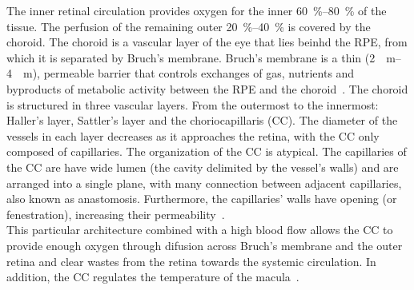 \documentclass[12pt,a4paper]{journal}
\begin{document}
The inner retinal circulation provides oxygen for the inner \SIrange{60}{80}{\percent} of the tissue.
The perfusion of the remaining outer \SIrange{20}{40}{\percent} is covered by the choroid.
The choroid is a vascular layer of the eye that lies beinhd the RPE, from which it is separated by Bruch's membrane.
Bruch's membrane is a thin (\SIrange{2}{4}{\mu\meter}), permeable barrier that controls exchanges of gas, nutrients and byproducts of metabolic activity between the RPE and the choroid~\cite{Curcio2013}. 
The choroid is structured in three vascular layers.
From the outermost to the innermost: Haller's layer, Sattler's layer and the choriocapillaris (CC).
The diameter of the vessels in each layer decreases as it approaches the retina, with the CC only composed of capillaries.
The organization of the CC is atypical.
The capillaries of the CC are have wide lumen (the cavity delimited by the vessel's walls) and are arranged into a single plane, with many connection between adjacent capillaries, also known as anastomosis.
Furthermore, the capillaries' walls have opening (or fenestration), increasing their permeability~\cite{Torczynski1976}.\\
This particular architecture combined with a high blood flow allows the CC to provide enough oxygen through difusion across Bruch's membrane and the outer retina and clear wastes from the retina towards the systemic circulation.
In addition, the CC regulates the temperature of the macula~\cite{Parver1991}.
\end{document}
